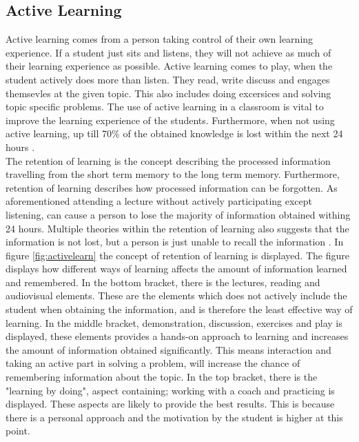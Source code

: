	\subsection*{Active Learning}
	Active learning comes from a person taking control of their own learning experience. If a student just sits and listens, they will not achieve as much of their learning experience as possible. Active learning comes to play, when the student actively does more than listen. They read, write discuss and engages themsevles at the given topic. This also includes doing excersices and solving topic specific problems\cite{activelearning}. The use of active learning in a classroom is vital to improve the learning experience of the students. Furthermore, when not using active learning, up till 70\% of the obtained knowledge is lost within the next 24 hours \cite{learning}.\\
	
	The retention of learning is the concept describing the processed information travelling from the short term memory to the long term memory. Furthermore, retention of learning describes how processed information can be forgotten. As aforementioned attending a lecture without actively participating except listening, can cause a person to lose the majority of information obtained withing 24 hours. Multiple theories within the retention of learning also suggests that the information is not lost, but a person is just unable to recall the information \cite{retention}.
	In figure \ref{fig:activelearn} the concept of retention of learning is displayed. The figure displays how different ways of learning affects the amount of information learned and remembered. In the bottom bracket, there is the lectures, reading and audiovisual elements. These are the elements which does not actively include the student when obtaining the information, and is therefore the least effective way of learning. In the middle bracket, demonstration, discussion, exercises and play is displayed, these elements provides a hands-on approach to learning and increases the amount of information obtained significantly. This means interaction and taking an active part in solving a problem, will increase the chance of remembering information about the topic. In the top bracket, there is the "learning by doing", aspect containing; working with a coach and practicing is displayed. These aspects are likely to provide the best results. This is because there is a personal approach and the motivation by the student is higher at this point\cite{retention}. 
	
